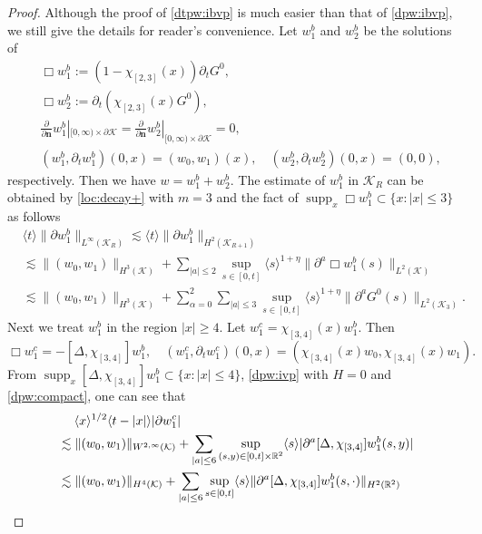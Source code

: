 \documentclass[11pt,twoside]{article}
\def\cK{\mathcal K}
\def\R{\mathop{\mathbb R\kern 0pt}\nolimits}
\def\supp{\mathop{\rm supp}\nolimits}
\def\p{\partial}
\def\supp{\operatorname{supp}}
\def\ls{\lesssim}
\def\bn{\mathbf{n}}
\newcommand{\w}[1]{\langle {#1} \rangle}
\theoremstyle{plain}
\theoremstyle{definition}
\numberwithin{equation}{section}
\begin{document}
\begin{proof}
Although the proof of \eqref{dtpw:ibvp} is much easier than that of \eqref{dpw:ibvp},
we still give the details for reader's convenience.
Let $w_1^b$ and $w_2^b$ be the solutions of
\begin{equation*}
\begin{split}
&\Box w_1^b:=(1-\chi_{[2,3]}(x))\p_tG^0,\\
&\Box w_2^b:=\p_t(\chi_{[2,3]}(x)G^0),\\
&\frac{\p}{\p\bn}w_1^b|_{[0,\infty)\times\p\cK}=\frac{\p}{\p\bn}w_2^b|_{[0,\infty)\times\p\cK}=0,\\
&(w_1^b,\p_tw_1^b)(0,x)=(w_0,w_1)(x),\quad (w_2^b,\p_tw_2^b)(0,x)=(0,0),
\end{split}
\end{equation*}
respectively.
Then we have $w=w_1^b+w_2^b$.
The estimate of $w_1^b$ in $\cK_R$ can be obtained by \eqref{loc:decay+} with $m=3$ and the fact of $\supp_x\Box w_1^b\subset\{x:|x|\le3\}$
as follows
\begin{equation}\label{dtpw:pf1}
\begin{split}
&\w{t}\|\p w_1^b\|_{L^\infty(\cK_R)}\ls\w{t}\|\p w_1^b\|_{H^2(\cK_{R+1})}\\
&\ls\|(w_0,w_1)\|_{H^3(\cK)}+\sum_{|a|\le2}\sup_{s\in[0,t]}\w{s}^{1+\eta}\|\p^a\Box w_1^b(s)\|_{L^2(\cK)}\\
&\ls\|(w_0,w_1)\|_{H^3(\cK)}+\sum_{\alpha=0}^2\sum_{|a|\le3}\sup_{s\in[0,t]}\w{s}^{1+\eta}\|\p^aG^0(s)\|_{L^2(\cK_3)}.
\end{split}
\end{equation}
Next we treat $w_1^b$ in the region $|x|\ge4$. Let $w_1^c=\chi_{[3,4]}(x)w_1^b$. Then
\begin{equation*}
\Box w_1^c=-[\Delta,\chi_{[3,4]}]w_1^b,\quad (w_1^c,\p_tw_1^c)(0,x)=(\chi_{[3,4]}(x)w_0,\chi_{[3,4]}(x)w_1).
\end{equation*}
From $\supp_x[\Delta,\chi_{[3,4]}]w_1^b\subset\{x:|x|\le4\}$, \eqref{dpw:ivp} with $H=0$ and \eqref{dpw:compact},
one can see that
\begin{equation}\label{dtpw:pf2}
\begin{split}
&\quad\; \w{x}^{1/2}\w{t-|x|}|\p w_1^c|\\
&\ls\|(w_0,w_1)\|_{W^{2,\infty}(\cK)}+\sum_{|a|\le6}\sup_{(s,y)\in[0,t]\times\R^2}\w{s}|\p^a[\Delta,\chi_{[3,4]}]w_1^b(s,y)|\\
&\ls\|(w_0,w_1)\|_{H^4(\cK)}+\sum_{|a|\le6}\sup_{s\in[0,t]}\w{s}\|\p^a[\Delta,\chi_{[3,4]}]w_1^b(s,\cdot)\|_{H^2(\R^2)}\\

\end{split}
\end{equation}
\end{proof}
\end{document}

